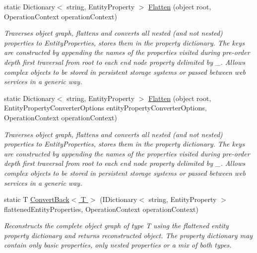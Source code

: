 \begin{DoxyCompactItemize}
\item 
static Dictionary$<$ string, Entity\+Property $>$ \hyperlink{classMicrosoft_1_1WindowsAzure_1_1Storage_1_1Table_1_1EntityPropertyConverter_ab1aaabbbfb7723aa066a418ca312a565_ab1aaabbbfb7723aa066a418ca312a565}{Flatten} (object root, Operation\+Context operation\+Context)
\begin{DoxyCompactList}\small\item\em Traverses object graph, flattens and converts all nested (and not nested) properties to Entity\+Properties, stores them in the property dictionary. The keys are constructed by appending the names of the properties visited during pre-\/order depth first traversal from root to each end node property delimited by \textquotesingle{}\+\_\+\textquotesingle{}. Allows complex objects to be stored in persistent storage systems or passed between web services in a generic way. \end{DoxyCompactList}\item 
static Dictionary$<$ string, Entity\+Property $>$ \hyperlink{classMicrosoft_1_1WindowsAzure_1_1Storage_1_1Table_1_1EntityPropertyConverter_a45373e2614d05c18ecb74bdcafc572b6_a45373e2614d05c18ecb74bdcafc572b6}{Flatten} (object root, Entity\+Property\+Converter\+Options entity\+Property\+Converter\+Options, Operation\+Context operation\+Context)
\begin{DoxyCompactList}\small\item\em Traverses object graph, flattens and converts all nested (and not nested) properties to Entity\+Properties, stores them in the property dictionary. The keys are constructed by appending the names of the properties visited during pre-\/order depth first traversal from root to each end node property delimited by \textquotesingle{}\+\_\+\textquotesingle{}. Allows complex objects to be stored in persistent storage systems or passed between web services in a generic way. \end{DoxyCompactList}\item 
static T \hyperlink{classMicrosoft_1_1WindowsAzure_1_1Storage_1_1Table_1_1EntityPropertyConverter_afb4edd95dfd79d576091119b5ac13ad7_afb4edd95dfd79d576091119b5ac13ad7}{Convert\+Back$<$ T $>$} (I\+Dictionary$<$ string, Entity\+Property $>$ flattened\+Entity\+Properties, Operation\+Context operation\+Context)
\begin{DoxyCompactList}\small\item\em Reconstructs the complete object graph of type T using the flattened entity property dictionary and returns reconstructed object. The property dictionary may contain only basic properties, only nested properties or a mix of both types. \end{DoxyCompactList}\item 

\end{DoxyCompactItemize}
